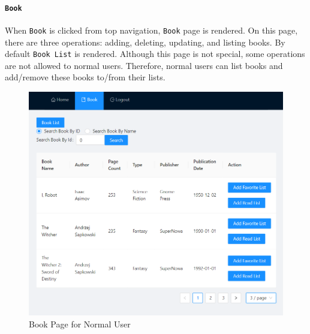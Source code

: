 \paragraph{\texttt{Book}}

When \texttt{Book} is clicked from top navigation, \texttt{Book} page is rendered. On this page, there are three operations: adding, deleting, updating, and listing books. By default \texttt{Book List} is rendered. Although this page is not special, some operations are not allowed to normal users. Therefore, normal users can list books and add/remove these books to/from their lists.

\begin{minipage}{.49\textwidth}
  \begin{figure}[H]
    \centering
    \includegraphics[width=\linewidth]{img/front-end/book-no-admin.png}
    \caption{Book Page for Normal User}
  \end{figure}
\end{minipage}
